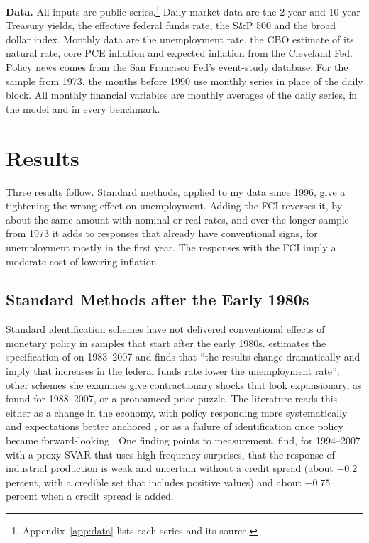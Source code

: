 \documentclass[11pt]{article}
\begin{document}
\textbf{Data.} All inputs are public series.\footnote{Appendix~\ref{app:data} lists each series and its source.} Daily market data are the 2-year and 10-year Treasury yields, the effective federal funds rate, the S\&P 500 and the broad dollar index. Monthly data are the unemployment rate, the CBO estimate of its natural rate, core PCE inflation and expected inflation from the Cleveland Fed. Policy news comes from the San Francisco Fed's event-study database. For the sample from 1973, the months before 1990 use monthly series in place of the daily block. All monthly financial variables are monthly averages of the daily series, in the model and in every benchmark.

\FloatBarrier
\section{Results}\label{sec:results}
Three results follow. Standard methods, applied to my data since 1996, give a tightening the wrong effect on unemployment. Adding the FCI reverses it, by about the same amount with nominal or real rates, and over the longer sample from 1973 it adds to responses that already have conventional signs, for unemployment mostly in the first year. The responses with the FCI imply a moderate cost of lowering inflation.

\subsection{Standard Methods after the Early 1980s}\label{sec:standard}
Standard identification schemes have not delivered conventional effects of monetary policy in samples that start after the early 1980s. \citet{ramey2016} estimates the specification of \citet{christiano1999} on 1983--2007 and finds that ``the results change dramatically and imply that increases in the federal funds rate lower the unemployment rate''; other schemes she examines give contractionary shocks that look expansionary, as \citet{barakchian2013} found for 1988--2007, or a pronounced price puzzle. The literature reads this either as a change in the economy, with policy responding more systematically and expectations better anchored \citep{boivin2006,boivin2010,primiceri2005}, or as a failure of identification once policy became forward-looking \citep{barakchian2013}. One finding points to measurement. \citet{caldara2019} find, for 1994--2007 with a proxy SVAR that uses high-frequency surprises, that the response of industrial production is weak and uncertain without a credit spread (about $-0.2$ percent, with a credible set that includes positive values) and about $-0.75$ percent when a credit spread is added.
\end{document}
